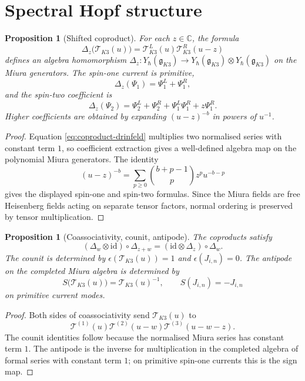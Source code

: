 \documentclass[11pt]{article}
\newtheorem{proposition}[theorem]{Proposition}
\theoremstyle{definition}
\newcommand{\C}{\mathbb{C}}
\renewcommand{\gg}{\mathfrak{g}}
\newcommand{\YgK}{Y_\hbar(\gg_{K3})}
\begin{document}
\section{Spectral Hopf structure}
\label{sec:hopf-structure}

\begin{proposition}[Shifted coproduct]
\label{prop:coproduct-drinfeld}
For each $z\in\C$, the formula
\begin{equation}
\label{eq:coproduct-drinfeld}
  \Delta_z\bigl(\mathcal T_{K3}(u)\bigr)
  =
  \mathcal T_{K3}^{L}(u)\mathcal T_{K3}^{R}(u-z)
\end{equation}
defines an algebra homomorphism
$\Delta_z:\YgK\to\YgK\otimes\YgK$ on the Miura generators. The spin-one
current is primitive,
\[
  \Delta_z(\Psi_1)=\Psi_1^L+\Psi_1^R,
\]
and the spin-two coefficient is
\[
  \Delta_z(\Psi_2)
  =
  \Psi_2^L+\Psi_2^R+\Psi_1^L\Psi_1^R+z\Psi_1^R.
\]
Higher coefficients are obtained by expanding $(u-z)^{-b}$ in powers of
$u^{-1}$.
\end{proposition}

\begin{proof}
Equation \eqref{eq:coproduct-drinfeld} multiplies two normalised
series with constant term $1$, so coefficient extraction gives a
well-defined algebra map on the polynomial Miura generators. The identity
\[
  (u-z)^{-b}
  =
  \sum_{p\geq0}\binom{b+p-1}{p}z^p u^{-b-p}
\]
gives the displayed spin-one and spin-two formulas. Since the Miura
fields are free Heisenberg fields acting on separate tensor factors,
normal ordering is preserved by tensor multiplication.
\end{proof}

\begin{proposition}[Coassociativity, counit, antipode]
\label{prop:hopf-axioms}
The coproducts satisfy
\[
  (\Delta_w\otimes\mathrm{id})\circ\Delta_{z+w}
  =
  (\mathrm{id}\otimes\Delta_z)\circ\Delta_w.
\]
The counit is determined by
$\epsilon(\mathcal T_{K3}(u))=1$ and $\epsilon(J_{i,n})=0$. The antipode
on the completed Miura algebra is determined by
\[
  S\bigl(\mathcal T_{K3}(u)\bigr)=\mathcal T_{K3}(u)^{-1},
  \qquad S(J_{i,n})=-J_{i,n}
\]
on primitive current modes.
\end{proposition}

\begin{proof}
Both sides of coassociativity send $\mathcal T_{K3}(u)$ to
\[
  \mathcal T^{(1)}(u)\mathcal T^{(2)}(u-w)\mathcal T^{(3)}(u-w-z).
\]
The counit identities follow because the normalised Miura series has
constant term $1$. The antipode is the inverse for multiplication in the
completed algebra of formal series with constant term $1$; on primitive
spin-one currents this is the sign map.
\end{proof}
\end{document}
